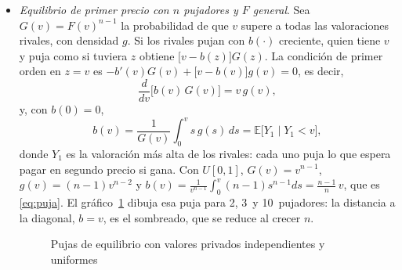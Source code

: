 \documentclass[11pt]{article}
\begin{document}
\begin{itemize}
\item \emph{Equilibrio de primer precio con $n$ pujadores y $F$ general}. Sea $G(v)=F(v)^{n-1}$ la probabilidad de que $v$ supere a todas las valoraciones rivales, con densidad $g$. Si los rivales pujan con $b(\cdot)$ creciente, quien tiene $v$ y puja como si tuviera $z$ obtiene $\big[v-b(z)\big]G(z)$. La condición de primer orden en $z=v$ es $-b'(v)G(v)+\big[v-b(v)\big]g(v)=0$, es decir,
\[
\frac{d}{dv}\big[b(v)\,G(v)\big]=v\,g(v),
\]
  y, con $b(0)=0$,
\[
b(v)=\frac{1}{G(v)}\int_0^v s\,g(s)\,ds=\mathbb{E}\big[Y_1\mid Y_1<v\big],
\]
  donde $Y_1$ es la valoración más alta de los rivales: cada uno puja lo que espera pagar en segundo precio si gana. Con $U[0,1]$, $G(v)=v^{n-1}$, $g(v)=(n-1)v^{n-2}$ y $b(v)=\frac{1}{v^{n-1}}\int_0^v(n-1)s^{n-1}ds=\frac{n-1}{n}\,v$, que es \eqref{eq:puja}. El gráfico~\ref{fig:pujas} dibuja esa puja para 2, 3~y 10~pujadores: la distancia a la diagonal, $b=v$, es el sombreado, que se reduce al crecer $n$.\findemo

\begin{figure}[H]
\centering
\caption{Pujas de equilibrio con valores privados independientes y uniformes}\label{fig:pujas}
\end{figure}



\end{itemize}
\end{document}
